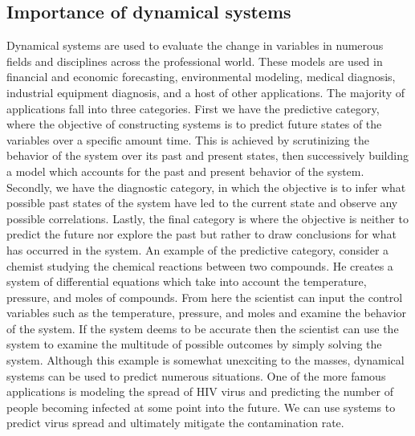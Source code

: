 \documentclass{article}
\begin{document}
\subsection{Importance of dynamical systems}
Dynamical systems are used to evaluate the change in variables in numerous fields and disciplines across the professional world. These models are used in financial and economic forecasting, environmental modeling, medical diagnosis, industrial equipment diagnosis, and a host of other applications. 
\newline
\linebreak
The majority of applications fall into three categories. First we have the predictive category, where the objective of constructing systems is to predict future states of the variables over a specific amount time. This is achieved by scrutinizing the behavior of the system over its past and present states, then successively building a model which accounts for the past and present behavior of the system. Secondly, we have the diagnostic category, in which the objective is to infer what possible past states of the system have led to the current state and observe any possible correlations. Lastly, the final category is where the objective is neither to predict the future nor explore the past but rather to draw conclusions for what has occurred in the system.  
\newline
\linebreak
An example of the predictive category, consider a chemist studying the chemical reactions between two compounds. He creates a system of differential equations which take into account the temperature, pressure, and moles of compounds. From here the scientist can input the control variables such as the temperature, pressure, and moles and examine the behavior of the system. If the system deems to be accurate then the scientist can use the system to examine the multitude of possible outcomes by simply solving the system. 
\newline
\linebreak
Although this example is somewhat unexciting to the masses, dynamical systems can be used to predict numerous situations. One of the more famous applications is modeling the spread of HIV virus and predicting the number of people becoming infected at some point into the future. We can use systems to predict virus spread and ultimately mitigate the contamination rate. 
\end{document}
